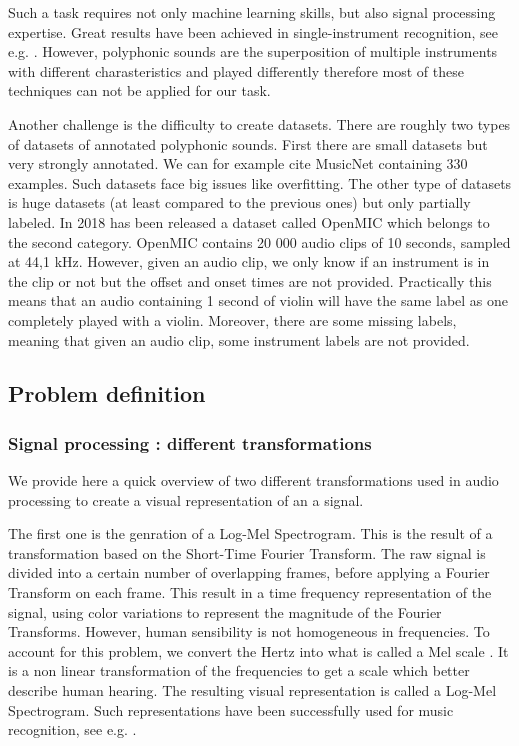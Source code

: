 \documentclass[final]{cvpr}
\begin{document}
Such a task requires not only machine learning skills, but also signal processing expertise. Great results have been achieved in single-instrument recognition, see e.g. \cite{mir}. However, polyphonic sounds are the superposition of multiple instruments with different charasteristics and played differently therefore most of these techniques can not be applied for our task.

Another challenge is the difficulty to create datasets. There are roughly two types of datasets of annotated polyphonic sounds. First there are small datasets but very strongly annotated. We can for example cite MusicNet \cite{MusicNet} containing 330 examples. Such datasets face big issues like overfitting. The other type of datasets is huge datasets (at least compared to the previous ones) but only partially labeled. In 2018 has been released a dataset called OpenMIC \cite{MIC} which belongs to the second category. OpenMIC contains 20 000 audio clips of 10 seconds, sampled at 44,1 kHz. However, given an audio clip, we only know if an instrument is in the clip or not but the offset and onset times are not provided. Practically this means that an audio containing 1 second of violin will have the same label as one completely played with a violin. Moreover, there are some missing labels, meaning that given an audio clip, some instrument labels are not provided. 
\subsection{Problem definition}
\subsubsection{Signal processing : different transformations}
We provide here a quick overview of two different transformations used in audio processing to create a visual representation of an a signal.

The first one is the genration of a Log-Mel Spectrogram. This is the result of a transformation based on the Short-Time Fourier Transform. The raw signal is divided into a certain number of overlapping frames, before applying a Fourier Transform on each frame. This result in a time frequency representation of the signal, using color variations to represent the magnitude of the Fourier Transforms. However, human sensibility is not homogeneous in frequencies. To account for this problem, we convert the Hertz into what is called a Mel scale \cite{mel}. It is a non linear transformation of the frequencies to get a scale which better describe human hearing. The resulting visual representation is called a Log-Mel Spectrogram. Such representations have been successfully used for music recognition, see e.g. \cite{spectrogram}.
\end{document}
